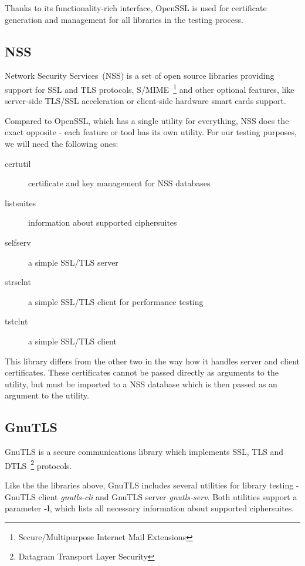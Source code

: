     Thanks to its functionality-rich interface, OpenSSL is used for certificate
    generation and management for all libraries in the testing process.

\subsection{NSS}
    Network Security Services~(NSS) is a set of open source libraries providing
    support for SSL and TLS protocols,
    S/MIME~\footnote{Secure/Multipurpose Internet Mail Extensions}
    and other optional features, like
    server-side TLS/SSL acceleration or client-side hardware smart cards support.

    Compared to OpenSSL, which has a single utility for everything, NSS does
    the exact opposite - each feature or tool has its own utility. For our
    testing purposes, we will need the following ones:
    \begin{description}
        \item [certutil] certificate and key management for NSS databases
        \item [listsuites] information about supported ciphersuites
        \item [selfserv] a simple SSL/TLS server
        \item [strsclnt] a simple SSL/TLS client for performance testing
        \item [tstclnt] a simple SSL/TLS client
    \end{description}

    This library differs from the other two in the way how it handles
    server and client certificates. These certificates cannot be passed
    directly as arguments to the utility, but must be imported to a NSS
    database which is then passed as an argument to the utility.

\subsection{GnuTLS}
    GnuTLS is a secure communications library which implements SSL, TLS and
    DTLS~\footnote{Datagram Transport Layer Security} protocols.

    Like the the libraries above, GnuTLS includes several utilities for library
    testing - GnuTLS client \textit{gnutls-cli} and GnuTLS server
    \textit{gnutls-serv}. Both utilities support a parameter \textbf{-l},
    which lists all necessary information about supported ciphersuites.

